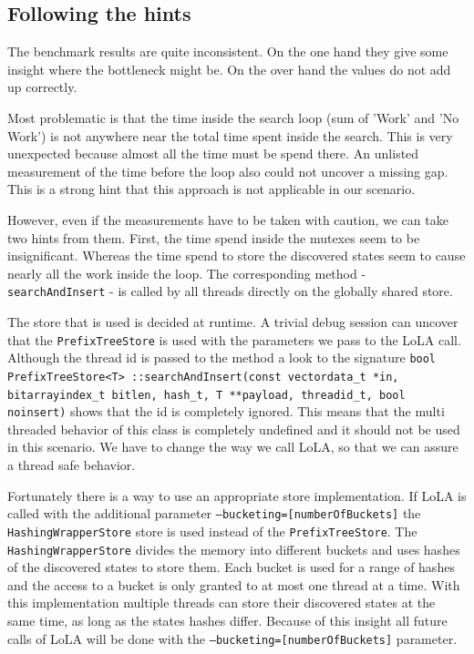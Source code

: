 \subsection{Following the hints}
The benchmark results are quite inconsistent. On the one hand they give some insight where the bottleneck might be. On the over hand the values do not add up correctly.

Most problematic is that the time inside the search loop (sum of 'Work' and 'No Work') is not anywhere near the total time spent inside the search. This is very unexpected because almost all the time must be spend there. An unlisted measurement of the time before the loop also could not uncover a missing gap. This is a strong hint that this approach is not applicable in our scenario.

However, even if the measurements have to be taken with caution, we can take two hints from them. First, the time spend inside the mutexes seem to be insignificant. Whereas the time spend to store the discovered states seem to cause nearly all the work inside the loop. The corresponding method - \texttt{searchAndInsert} - is called by all threads directly on the globally shared store.

The store that is used is decided at runtime. A trivial debug session can uncover that the \texttt{PrefixTreeStore} is used with the parameters we pass to the LoLA call. Although the thread id is passed to the method a look to the signature \texttt{bool PrefixTreeStore<T> ::searchAndInsert(const vectordata\_t *in, bitarrayindex\_t bitlen, hash\_t, T **payload, threadid\_t, bool noinsert)} shows that the id is completely ignored. This means that the multi threaded behavior of this class is completely undefined and it should not be used in this scenario. We have to change the way we call LoLA, so that we can assure a thread safe behavior.

Fortunately there is a way to use an appropriate store implementation. If LoLA is called with the additional parameter \texttt{--bucketing=[numberOfBuckets]} the \texttt{HashingWrapperStore} store is used instead of the \texttt{PrefixTreeStore}. The \texttt{HashingWrapperStore} divides the memory into different buckets and uses hashes of the discovered states to store them. Each bucket is used for a range of hashes and the access to a bucket is only granted to at most one thread at a time. With this implementation multiple threads can store their discovered states at the same time, as long as the states hashes differ. Because of this insight all future calls of LoLA will be done with the \texttt{--bucketing=[numberOfBuckets]} parameter.

